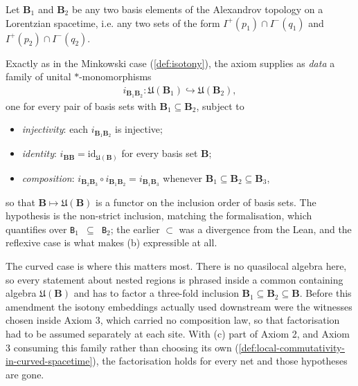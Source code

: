 \begin{definition}
    \label{def:isotony-in-curved-spacetime}
    \leanok
    Let $\mathbf{B}_1$ and $\mathbf{B}_2$ be any two basis elements of the Alexandrov topology on a Lorentzian spacetime, i.e. any two sets of the form $I^+(p_1) \cap I^-(q_1)$ and $I^+(p_2) \cap I^-(q_2)$.
    
    Exactly as in the Minkowski case (\ref{def:isotony}), the axiom supplies as \emph{data} a family of unital $*$-monomorphisms
    \begin{align}
        i_{\mathbf{B}_1\mathbf{B}_2} : \mathfrak{U}(\mathbf{B}_1) \hookrightarrow \mathfrak{U}(\mathbf{B}_2),
    \end{align}
    one for every pair of basis sets with $\mathbf{B}_1 \subseteq \mathbf{B}_2$, subject to
    \begin{itemize}
        \item[(a)] \emph{injectivity}: each $i_{\mathbf{B}_1\mathbf{B}_2}$ is injective;
        \item[(b)] \emph{identity}: $i_{\mathbf{B}\mathbf{B}} = \mathrm{id}_{\mathfrak{U}(\mathbf{B})}$ for every basis set $\mathbf{B}$;
        \item[(c)] \emph{composition}: $i_{\mathbf{B}_2\mathbf{B}_3} \circ i_{\mathbf{B}_1\mathbf{B}_2} = i_{\mathbf{B}_1\mathbf{B}_3}$ whenever $\mathbf{B}_1 \subseteq \mathbf{B}_2 \subseteq \mathbf{B}_3$,
    \end{itemize}
    so that $\mathbf{B} \mapsto \mathfrak{U}(\mathbf{B})$ is a functor on the inclusion order of basis sets. The hypothesis is the non-strict inclusion, matching the formalisation, which quantifies over \texttt{B\ensuremath{_1} \ensuremath{\subseteq} B\ensuremath{_2}}; the earlier $\subset$ was a divergence from the Lean, and the reflexive case is what makes (b) expressible at all.

    The curved case is where this matters most. There is no quasilocal algebra here, so every statement about nested regions is phrased inside a common containing algebra $\mathfrak{U}(\mathbf{B})$ and has to factor a three-fold inclusion $\mathbf{B}_1 \subseteq \mathbf{B}_2 \subseteq \mathbf{B}$. Before this amendment the isotony embeddings actually used downstream were the witnesses chosen inside Axiom 3, which carried no composition law, so that factorisation had to be assumed separately at each site. With (c) part of Axiom 2, and Axiom 3 consuming this family rather than choosing its own (\ref{def:local-commutativity-in-curved-spacetime}), the factorisation holds for every net and those hypotheses are gone.
\end{definition}

